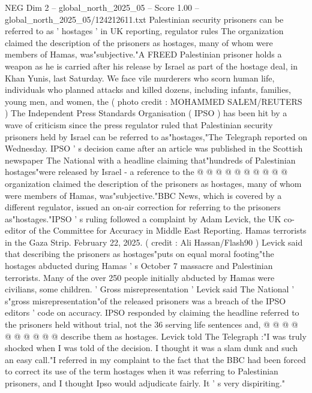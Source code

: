 \begin{textsample}{NEG Dim 2 – global\_north\_2025\_05 – Score 1.00 – global\_north\_2025\_05/124212611.txt}  \label{ex:f2_neg_036}
Palestinian security prisoners can be referred to as ' hostages ' in UK reporting, regulator rules The organization claimed the description of the prisoners as hostages, many of whom were members of Hamas, was"subjective."A FREED Palestinian prisoner holds a weapon as he is carried after his release by Israel as part of the hostage deal, in Khan Yunis, last Saturday.
We face vile murderers who scorn human life, individuals who planned attacks and killed dozens, including infants, families, young men, and women, the ( photo credit : MOHAMMED SALEM/REUTERS ) The Independent Press Standards Organisation ( IPSO ) has been hit by a wave of criticism since the press regulator ruled that Palestinian security prisoners held by Israel can be referred to as"hostages,"The Telegraph reported on Wednesday.
IPSO ' s decision came after an article was published in the Scottish newspaper The National with a headline claiming that"hundreds of Palestinian hostages"were released by Israel - a reference to the @ @ @ @ @ @ @ @ @ @ organization claimed the description of the prisoners as hostages, many of whom were members of Hamas, was"subjective."BBC News, which is covered by a different regulator, issued an on-air correction for referring to the prisoners as"hostages."IPSO ' s ruling followed a complaint by Adam Levick, the UK co-editor of the Committee for Accuracy in Middle East Reporting.
Hamas terrorists in the Gaza Strip.
February 22, 2025. ( credit : Ali Hassan/Flash90 ) Levick said that describing the prisoners as hostages"puts on equal moral footing"the hostages abducted during Hamas ' s October 7 massacre and Palestinian terrorists.
Many of the over 250 people initially abducted by Hamas were civilians, some children. ' Gross misrepresentation ' Levick said The National ' s"gross misrepresentation"of the released prisoners was a breach of the IPSO editors ' code on accuracy.
IPSO responded by claiming the headline referred to the prisoners held without trial, not the 36 serving life sentences and, @ @ @ @ @ @ @ @ @ @ describe them as hostages.
Levick told The Telegraph :"I was truly shocked when I was told of the decision.
I thought it was a slam dunk and such an easy call."I referred in my complaint to the fact that the BBC had been forced to correct its use of the term hostages when it was referring to Palestinian prisoners, and I thought Ipso would adjudicate fairly.
It ' s very dispiriting."

\end{textsample}
